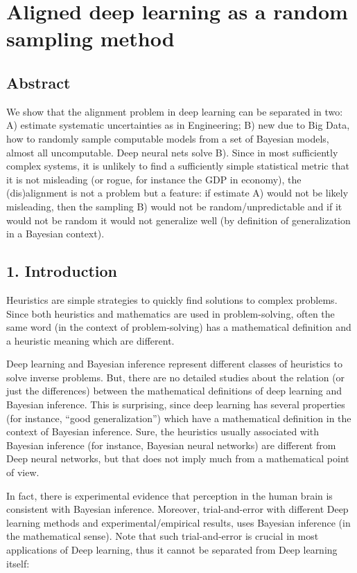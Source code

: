\documentclass[11pt]{book}
\begin{document}
\chapter{Aligned deep learning as a random sampling method}
\section*{Abstract}
We show that the alignment problem in deep learning can be separated in
two: A) estimate systematic uncertainties as in Engineering; B) new due
to Big Data, how to randomly sample computable models from a set of
Bayesian models, almost all uncomputable. Deep neural nets solve B).
Since in most sufficiently complex systems, it is unlikely to find a
sufficiently simple statistical metric that it is not misleading (or
rogue, for instance the GDP in economy), the (dis)alignment is not a
problem but a feature: if estimate A) would not be likely misleading,
then the sampling B) would not be random/unpredictable and if it would
not be random it would not generalize well (by definition of
generalization in a Bayesian context).


\hypertarget{introduction}{%
\section{1. Introduction}\label{introduction}}

Heuristics are simple strategies to quickly find solutions to complex
problems. Since both heuristics and mathematics are used in
problem-solving, often the same word (in the context of problem-solving)
has a mathematical definition and a heuristic meaning which are
different.

Deep learning\cite{muller_transformers_2022} and Bayesian inference
represent different classes of heuristics to solve inverse problems.
But, there are no detailed studies about the relation (or just the
differences) between the mathematical definitions of deep learning and
Bayesian inference\cite{fienberg_when_2006}. This is surprising, since deep learning has several properties
(for instance, ``good generalization'') which have a mathematical
definition in the context of Bayesian inference. Sure, the heuristics
usually associated with Bayesian inference (for instance, Bayesian
neural networks) are different from Deep neural
networks\cite{muller_transformers_2022}, but that does not imply much from a mathematical point of view.

In fact, there is experimental evidence that perception in the human
brain is consistent with Bayesian
inference\cite{harrison_neural_2023}. Moreover, trial-and-error with different Deep
learning methods and experimental/empirical results, uses Bayesian
inference (in the mathematical
sense)\cite{gal_dropout_2016}. Note that such trial-and-error is crucial in most applications
of Deep learning, thus it cannot be separated from Deep learning itself:
\end{document}
